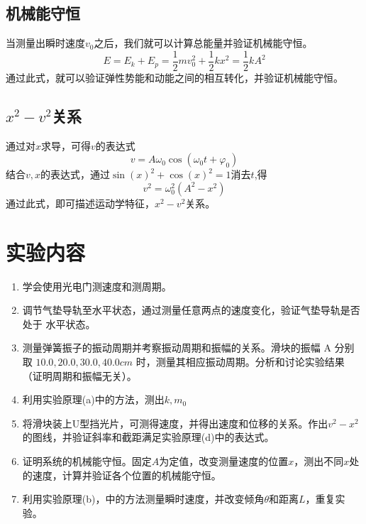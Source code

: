 \documentclass[11pt]{article}
\begin{document}
\subsection{机械能守恒}
			当测量出瞬时速度\(v_0\)之后，我们就可以计算总能量并验证机械能守恒。
			\begin{equation*}
				E=E_k+E_p=\frac{1}{2}mv_0^2+\frac{1}{2}kx^2=\frac{1}{2}kA^2
			\end{equation*}
			通过此式，就可以验证弹性势能和动能之间的相互转化，并验证机械能守恒。
\subsection{\(x^2-v^2\)关系}
			通过对\(x\)求导，可得\(v\)的表达式
			\begin{equation*}
				v=A\omega_0 \cos (\omega_0 t+\varphi_0)
			\end{equation*}
			结合\(v,x\)的表达式，通过\(\sin(x)^2+\cos(x)^2=1\)消去\(t\),得
			\begin{equation*}
				v^2=\omega_0^2(A^2-x^2)
			\end{equation*}
			通过此式，即可描述运动学特征，\(x^2-v^2\)关系。



\section{实验内容}
	\begin{enumerate}
		\item 学会使用光电门测速度和测周期。
		\item 调节气垫导轨至水平状态，通过测量任意两点的速度变化，验证气垫导轨是否处于
		水平状态。
		\item 测量弹簧振子的振动周期并考察振动周期和振幅的关系。滑块的振幅 A 分别取
		$10.0, 20.0, 30.0, 40.0 cm$ 时，测量其相应振动周期。分析和讨论实验结果（证明周期和振幅无关）。
		\item 利用实验原理(a)中的方法，测出\(k,m_0\)
		\item 将滑块装上U型挡光片，可测得速度，并得出速度和位移的关系。作出\(v^2-x^2\)的图线，并验证斜率和截距满足实验原理(d)中的表达式。
		\item 证明系统的机械能守恒。固定\(A\)为定值，改变测量速度的位置\(x\)，测出不同\(x\)处的速度，计算并验证各个位置的机械能守恒。
		\item 利用实验原理(b)，中的方法测量瞬时速度，并改变倾角\(\theta\)和距离\(L\)，重复实验。
	\end{enumerate}
\end{document}
